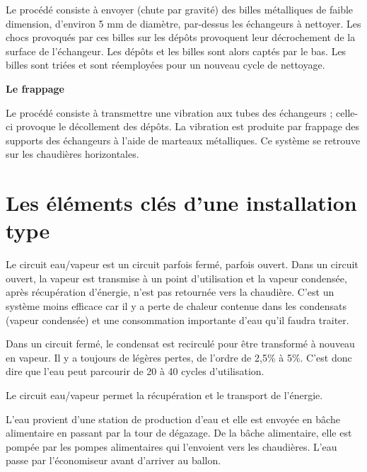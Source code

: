 Le procédé consiste à envoyer (chute par gravité) des billes métalliques de faible dimension, d’environ 5 mm de diamètre, par-dessus les échangeurs à nettoyer. Les chocs provoqués par ces billes sur les dépôts provoquent leur décrochement de la surface de l’échangeur. Les dépôts et les billes sont alors captés par le bas.
Les billes sont triées et sont réemployées pour un nouveau cycle de nettoyage.


\vspace{0.3cm}
\textbf{Le frappage}
\vspace{0.3cm}

Le procédé consiste à transmettre une vibration aux tubes des échangeurs ; celle-ci provoque le décollement des dépôts. La vibration est produite par frappage des supports des échangeurs à l’aide de marteaux métalliques. Ce système se retrouve sur les chaudières horizontales.



\section{Les éléments clés d'une installation type}

Le circuit eau/vapeur est un circuit parfois fermé, parfois ouvert. Dans un circuit ouvert, la vapeur est transmise à un point d’utilisation et la vapeur condensée, après récupération d’énergie, n’est pas retournée vers la chaudière. C’est un système moins efficace car il y a perte de chaleur contenue dans les condensats (vapeur condensée) et une consommation importante d’eau qu’il faudra traiter.
\vspace{0.3cm}

Dans un circuit fermé, le condensat est recirculé pour être transformé à nouveau en vapeur. Il y a toujours de légères pertes, de l’ordre de 2,5\% à 5\%. C’est donc dire que l’eau peut parcourir de 20 à 40 cycles d’utilisation.
\vspace{0.3cm}

Le circuit eau/vapeur permet la récupération et le transport de l’énergie. 
\vspace{0.3cm}

L’eau provient d’une station de production d’eau et elle est envoyée en bâche alimentaire en passant par la tour de dégazage. De la bâche alimentaire, elle est pompée par les pompes alimentaires qui l’envoient vers les chaudières. L’eau passe par l’économiseur avant d’arriver au ballon.
\vspace{0.3cm}

